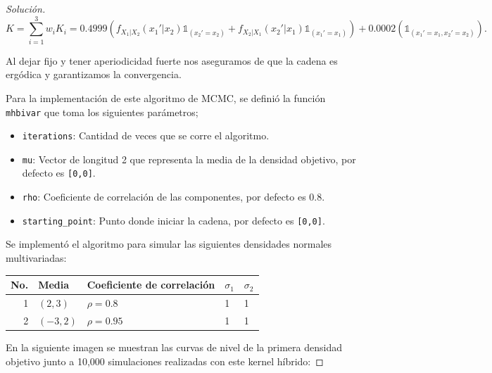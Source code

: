 \documentclass{article}
\begin{document}
\begin{enumerate}
\begin{proof}[Solución]
        \[ K = \sum_{i=1}^3 w_i K_i = 0.4999\left( f_{X_1|X_2}(x_1'|x_2)\mathds 1_{(x_2' = x_2)} 
        + f_{X_2|X_1}(x_2'|x_1)\mathds 1_{(x_1' = x_1)}\right) 
        + 0.0002(\mathds1_{(x_1'=x_1,x_2'=x_2)}).\]

        Al dejar fijo y tener aperiodicidad fuerte nos aseguramos de que la cadena es 
        ergódica y garantizamos la convergencia.

        Para la implementación de este algoritmo de MCMC, se definió la función 
        \texttt{mhbivar} que toma los siguientes parámetros;


        \begin{itemize}
            \item \texttt{iterations}: Cantidad de veces que se corre el algoritmo.
            \item \texttt{mu}: Vector de longitud 2 que representa la media de la 
            densidad objetivo, por defecto es \texttt{[0,0]}.
            \item \texttt{rho}: Coeficiente de correlación de las componentes, por 
            defecto es 0.8.
            \item \texttt{starting\_point}: Punto donde iniciar la cadena, por defecto 
            es \texttt{[0,0]}.
        \end{itemize}

        Se implementó el algoritmo para simular las siguientes densidades normales 
        multivariadas:

        \begin{center}
            \begin{tabular}{rllll}
                \hline
                \multicolumn{1}{l}{No.} & Media & Coeficiente de correlación & $\sigma_1$ & $\sigma_2$ \\ \hline
                1 & $(2,  3)$ & $\rho=0.8$  & 1 & 1 \\
                2 & $(-3, 2)$ & $\rho=0.95$ & 1 & 1 \\ \hline
                \end{tabular}
        \end{center}

        En la siguiente imagen se muestran las curvas de nivel de la primera densidad objetivo junto
        a 10,000 simulaciones realizadas con este kernel híbrido:


\end{proof}
\end{enumerate}
\end{document}
